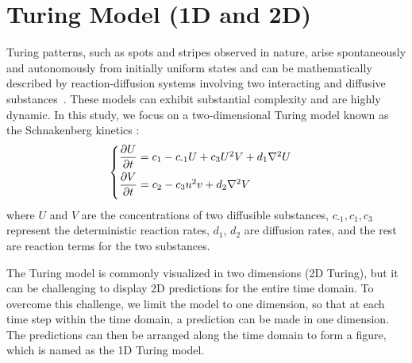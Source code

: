 



\section{Turing Model (1D and 2D)}
\label{appendix:turing}
Turing patterns, such as spots and stripes observed in nature, arise spontaneously and autonomously from initially uniform states and can be mathematically described by reaction-diffusion systems involving two interacting and diffusive substances~\cite{turing1990chemical}. These models can exhibit substantial complexity and are highly dynamic. In this study, we focus on a two-dimensional Turing model known as the Schnakenberg kinetics \cite{maini2012turing}:
\begin{equation}
\begin{cases}
\dfrac{\partial U}{\partial t}=c_{1}-c_{\text{-}1}U+c_{3}U^{2}V+d_{1}\nabla^{2} U \vspace{1ex}\\
\dfrac{\partial V}{\partial t}=c_{2}-c_{3}u^{2}v +d_{2}\nabla^{2} V \vspace{1ex}
\end{cases}
\end{equation}
where $U$ and $V$ are the concentrations of two diffusible substances, $c_{\text{-}1}, c_{1}, c_{3}$ represent the deterministic reaction rates, $d_{1}$, $d_{2}$ are diffusion rates, and the rest are reaction terms for the two substances.

The Turing model is commonly visualized in two dimensions (2D Turing), but it can be challenging to display 2D predictions for the entire time domain. To overcome this challenge, we limit the model to one dimension, so that at each time step within the time domain, a prediction can be made in one dimension. The predictions can then be arranged along the time domain to form a figure, which is named as the 1D Turing model.
